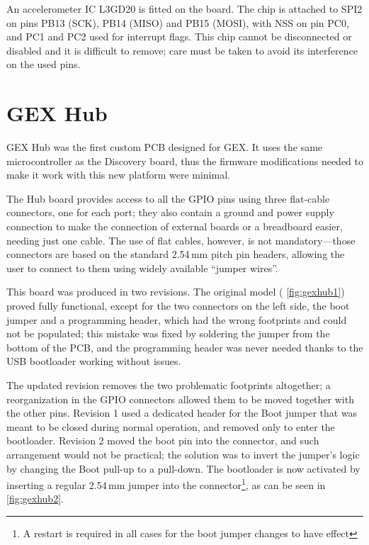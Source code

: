 An accelerometer \gls{IC} L3GD20 is fitted on the board. The chip is attached to SPI2 on pins PB13 (\gls{SCK}), PB14 (\gls{MISO}) and PB15 (\gls{MOSI}), with \gls{NSS} on pin PC0, and PC1 and PC2 used for interrupt flags. This chip cannot be disconnected or disabled and it is difficult to remove; care must be taken to avoid its interference on the used pins.

\section{GEX Hub}

GEX Hub was the first custom \gls{PCB} designed for GEX. It uses the same microcontroller as the Discovery board, thus the firmware modifications needed to make it work with this new platform were minimal.

The Hub board provides access to all the \gls{GPIO} pins using three flat-cable connectors, one for each port; they also contain a ground and power supply connection to make the connection of external boards or a breadboard easier, needing just one cable. The use of flat cables, however, is not mandatory---those connectors are based on the standard 2.54\,mm pitch pin headers, allowing the user to connect to them using widely available ``jumper wires''.

This board was produced in two revisions. The original model ( \cref{fig:gexhub1}) proved fully functional, except for the two connectors on the left side, the boot jumper and a programming header, which had the wrong footprints and could not be populated; this mistake was fixed by soldering the jumper from the bottom of the \gls{PCB}, and the programming header was never needed thanks to the USB bootloader working without issues. 

The updated revision removes the two problematic footprints altogether; a reorganization in the \gls{GPIO} connectors allowed them to be moved together with the other pins. Revision 1 used a dedicated header for the Boot jumper that was meant to be closed during normal operation, and removed only to enter the bootloader. Revision 2 moved the boot pin into the connector, and such arrangement would not be practical; the solution was to invert the jumper's logic by changing the Boot pull-up to a pull-down. The bootloader is now activated by inserting a regular 2.54\,mm jumper into the connector\footnote{A restart is required in all cases for the boot jumper changes to have effect}, as can be seen in \cref{fig:gexhub2}.

